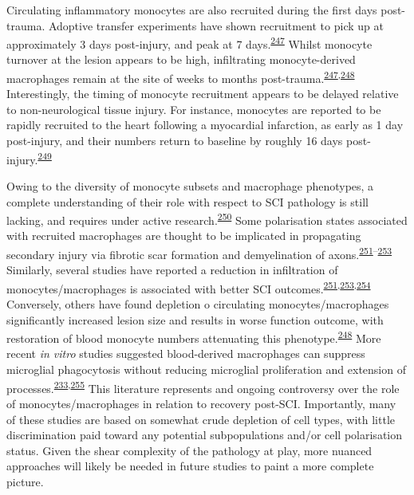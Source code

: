 \documentclass[
]{article}
\begin{document}
Circulating inflammatory monocytes are also recruited during the first days post-trauma.
Adoptive transfer experiments have shown recruitment to pick up at approximately 3 days post-injury, and peak at 7 days.\textsuperscript{\protect\hyperlink{ref-blomster_mobilisation_2013}{247}}
Whilst monocyte turnover at the lesion appears to be high, infiltrating monocyte-derived macrophages remain at the site of weeks to months post-trauma.\textsuperscript{\protect\hyperlink{ref-blomster_mobilisation_2013}{247},\protect\hyperlink{ref-shechter_infiltrating_2009}{248}}
Interestingly, the timing of monocyte recruitment appears to be delayed relative to non-neurological tissue injury.
For instance, monocytes are reported to be rapidly recruited to the heart following a myocardial infarction, as early as 1 day post-injury, and their numbers return to baseline by roughly 16 days post-injury.\textsuperscript{\protect\hyperlink{ref-nahrendorf_healing_2007}{249}}

Owing to the diversity of monocyte subsets and macrophage phenotypes, a complete understanding of their role with respect to SCI pathology is still lacking, and requires under active research.\textsuperscript{\protect\hyperlink{ref-david_repertoire_2011}{250}}
Some polarisation states associated with recruited macrophages are thought to be implicated in propagating secondary injury via fibrotic scar formation and demyelination of axons.\textsuperscript{\protect\hyperlink{ref-kigerl_identification_2009}{251}--\protect\hyperlink{ref-zhu_hematogenous_2015}{253}}
Similarly, several studies have reported a reduction in infiltration of monocytes/macrophages is associated with better SCI outcomes.\textsuperscript{\protect\hyperlink{ref-kigerl_identification_2009}{251},\protect\hyperlink{ref-zhu_hematogenous_2015}{253},\protect\hyperlink{ref-horn_another_2008}{254}}
Conversely, others have found depletion o circulating monocytes/macrophages significantly increased lesion size and results in worse function outcome, with restoration of blood monocyte numbers attenuating this phenotype.\textsuperscript{\protect\hyperlink{ref-shechter_infiltrating_2009}{248}}
More recent \emph{in vitro} studies suggested blood-derived macrophages can suppress microglial phagocytosis without reducing microglial proliferation and extension of processes.\textsuperscript{\protect\hyperlink{ref-greenhalgh_differences_2014}{233},\protect\hyperlink{ref-greenhalgh_peripherally_2018}{255}}
This literature represents and ongoing controversy over the role of monocytes/macrophages in relation to recovery post-SCI.
Importantly, many of these studies are based on somewhat crude depletion of cell types, with little discrimination paid toward any potential subpopulations and/or cell polarisation status.
Given the shear complexity of the pathology at play, more nuanced approaches will likely be needed in future studies to paint a more complete picture.
\end{document}
